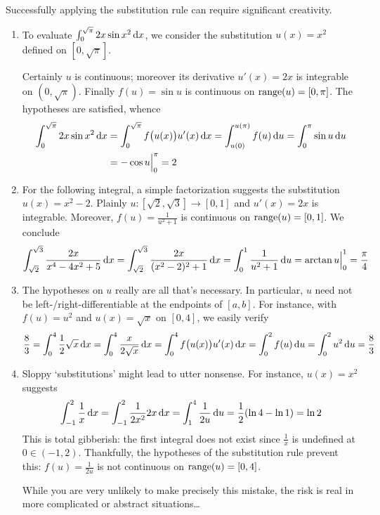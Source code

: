 \begin{examples}{}{}
	Successfully applying the substitution rule can require significant creativity.\footnotemark
	\begin{enumerate}
	  \item To evaluate $\int_0^{\sqrt\pi}2x\sin x^2\,{\mathrm{d} x}$, we consider the substitution $u(x)=x^2$ defined on $[0,\sqrt\pi]$.\par
	  Certainly $u$ is continuous; moreover its derivative $u'(x)=2x$ is integrable on $(0,\sqrt\pi)$. Finally $f(u)=\sin u$ is continuous on $\operatorname{range}(u)=[0,\pi]$. The hypotheses are satisfied, whence
	  \begin{align*}
	  	\int_0^{\sqrt\pi}2x\sin x^2\,{\mathrm{d} x} 
	  	&=\int_0^{\sqrt\pi} f\bigl(u(x)\bigr)u'(x)\,{\mathrm{d} x} 
	  		=\int_{u(0)}^{u(\pi)}f(u)\,{\mathrm{d} u}
	  		=\int_0^\pi\sin u\,{\mathrm{d} u} \\
	  	&=-\cos u\Big|_0^\pi=2
	  \end{align*}
	  
		\item For the following integral, a simple factorization suggests the substitution $u(x)=x^2-2$. Plainly $u:[\sqrt 2,\sqrt 3]\to[0,1]$ and $u'(x)=2x$ is integrable. Moreover, $f(u)=\frac 1{u^2+1}$ is continuous on $\operatorname{range}(u)=[0,1]$. We conclude
		\[
			\int_{\sqrt 2}^{\sqrt 3}\frac{2x}{x^4-4x^2+5}\,{\mathrm{d} x}
			=\int_{\sqrt 2}^{\sqrt 3}\frac{2x}{(x^2-2)^2+1}\,{\mathrm{d} x}
			=\int_0^1\frac{1}{u^2+1}\,{\mathrm{d} u} 
			=\arctan u\Big|_0^1 =\frac\pi 4
		\]
		
		\item The hypotheses on $u$ really are all that's necessary. In particular, $u$ need not be left-/right-differentiable at the endpoints of $[a,b]$. For instance, with $f(u)=u^2$ and $u(x)=\sqrt x$ on $[0,4]$, we easily verify
		\[
			\frac 83=\int_0^4\frac 12\sqrt x\,{\mathrm{d} x} 
			=\int_0^4\frac x{2\sqrt x}\,{\mathrm{d} x} 
			=\int_0^4f\bigl(u(x)\bigr)u'(x)\,{\mathrm{d} x}
			=\int_0^2f(u)\,{\mathrm{d} u} 
			=\int_0^2u^2\,{\mathrm{d} u} =\frac 83
		\]
		
		\item Sloppy `substitutions' might lead to utter nonsense. For instance, $u(x)=x^2$ suggests
		\[
			\int_{-1}^2\frac 1x\,{\mathrm{d} x}= \int_{-1}^2\frac 1{2x^2}2x\,{\mathrm{d} x} =\int_1^4\frac 1{2u}\,{\mathrm{d} u}=\frac 12(\ln 4-\ln 1)=\ln 2
		\]
		This is total gibberish: the first integral does not exist since $\frac 1x$ is undefined at $0\in(-1,2)$. Thankfully, the hypotheses of the substitution rule prevent this: $f(u)=\frac 1{2u}$ is not continuous on $\operatorname{range}(u)=[0,4]$.\par
		While you are very unlikely to make precisely this mistake, the risk is real in more complicated or abstract situations\ldots
	\end{enumerate}
\end{examples}

